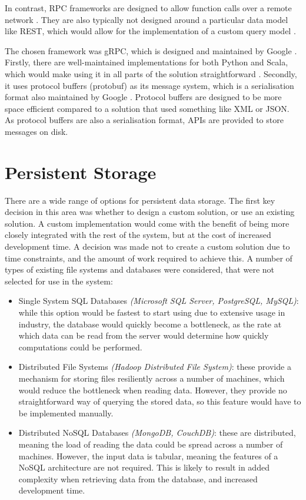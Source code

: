 In contrast, RPC frameworks are designed to allow function calls over a remote network \cite{srinivasan1995rpc}. They are also typically not designed around a particular data model like REST, which would allow for the implementation of a custom query model . 

The chosen framework was gRPC, which is designed and maintained by Google \cite{gRPCapi}. Firstly, there are well-maintained implementations for both Python and Scala, which would make using it in all parts of the solution straightforward \cite{scalapbdocs}. Secondly, it uses protocol buffers (protobuf) as its message system, which is a serialisation format also maintained by Google \cite{protobufdocs}. Protocol buffers are designed to be more space efficient compared to a solution that used something like XML or JSON. As protocol buffers are also a serialisation format, APIs are provided to store messages on disk.


\section{Persistent Storage}
There are a wide range of options for persistent data storage. The first key decision in this area was whether to design a custom solution, or use an existing solution. A custom implementation would come with the benefit of being more closely integrated with the rest of the system, but at the cost of increased development time. A decision was made not to create a custom solution due to time constraints, and the amount of work required to achieve this. A number of types of existing file systems and databases were considered, that were not selected for use in the system:
\begin{itemize}
	\item Single System SQL Databases \textit{(Microsoft SQL Server, PostgreSQL, MySQL)}: while this option would be fastest to start using due to extensive   usage in industry, the database would quickly become a bottleneck, as the rate at which data can be read from the server would determine how quickly computations could be performed.
	\item Distributed File Systems \textit{(Hadoop Distributed File System)}: these provide a mechanism for storing files resiliently across a number of machines, which would reduce the bottleneck when reading data. However, they provide no straightforward way of querying the stored data, so this feature would have to be implemented manually.
	\item Distributed NoSQL Databases \textit{(MongoDB, CouchDB)}: these are distributed, meaning the load of reading the data could be spread across a number of machines. However, the input data is tabular, meaning the features of a NoSQL architecture are not required. This is likely to result in added complexity when retrieving data from the database, and increased development time.
\end{itemize}

